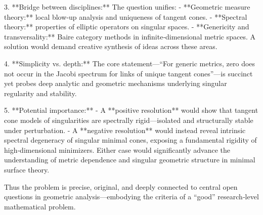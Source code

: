 3. **Bridge between disciplines:**  
   The question unifies:
   - **Geometric measure theory:** local blow‑up analysis and uniqueness of tangent cones.  
   - **Spectral theory:** properties of elliptic operators on singular spaces.  
   - **Genericity and transversality:** Baire category methods in infinite‑dimensional metric spaces.  
   A solution would demand creative synthesis of ideas across these areas.

4. **Simplicity vs. depth:**  
   The core statement—“For generic metrics, zero does not occur in the Jacobi spectrum for links of unique tangent cones”—is succinct yet probes deep analytic and geometric mechanisms underlying singular regularity and stability.

5. **Potential importance:**  
   - A **positive resolution** would show that tangent cone models of singularities are spectrally rigid—isolated and structurally stable under perturbation.  
   - A **negative resolution** would instead reveal intrinsic spectral degeneracy of singular minimal cones, exposing a fundamental rigidity of high‑dimensional minimizers.  
   Either case would significantly advance the understanding of metric dependence and singular geometric structure in minimal surface theory.

Thus the problem is precise, original, and deeply connected to central open questions in geometric analysis—embodying the criteria of a “good” research‑level mathematical problem.